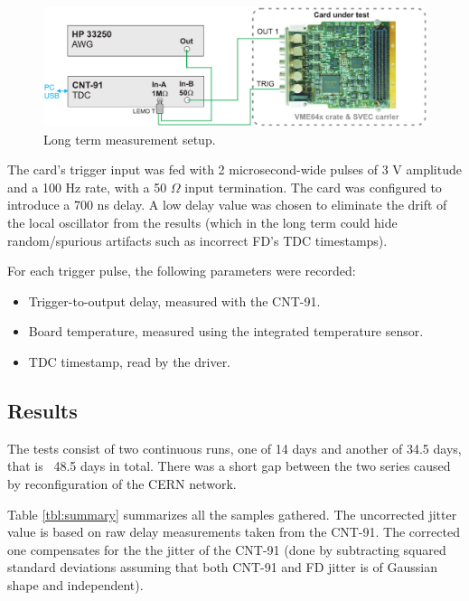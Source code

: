 \documentclass{article}
\begin{document}
\begin{figure}[htb]
\centering
\includegraphics[width=16cm]{drawings/connection_diagram}
\caption{Long term measurement setup.}
\label{fig:meas_system}
\end{figure}

The card's trigger input was fed with 2 microsecond-wide pulses of 3 V amplitude and a 100 Hz rate, with a 50 $\Omega$ input termination. The card was configured to introduce a 700 ns delay. A low delay value was chosen to eliminate the drift of the local oscillator from the results (which in the long term could hide random/spurious artifacts such as incorrect FD's TDC timestamps).

For each trigger pulse, the following parameters were recorded:
\begin{itemize}
\item Trigger-to-output delay, measured with the CNT-91.
\item Board temperature, measured using the integrated temperature sensor.
\item TDC timestamp, read by the driver.
\end{itemize}

\subsection{Results}

The tests consist of two continuous runs, one of 14 days and another of 34.5 days, that is ~48.5 days in total. 
There was a short gap between the two series caused by reconfiguration of the CERN network.

Table \ref{tbl:summary} summarizes all the samples gathered. The uncorrected jitter value is based on raw delay 
measurements taken from the CNT-91. The corrected one compensates for the the jitter of the 
CNT-91 (done by subtracting squared standard deviations assuming that both CNT-91 and FD jitter is of Gaussian shape and independent).
\end{document}
